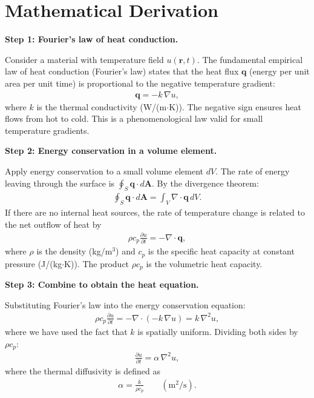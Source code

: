 \section*{Mathematical Derivation}

\textbf{Step 1: Fourier's law of heat conduction.}

Consider a material with temperature field $u(\mathbf{r}, t)$. The fundamental empirical law of heat conduction (Fourier's law) states that the heat flux $\mathbf{q}$ (energy per unit area per unit time) is proportional to the negative temperature gradient:
\begin{align}
\mathbf{q} = -k\,\nabla u,
\end{align}
where $k$ is the thermal conductivity (W/(m$\cdot$K)). The negative sign ensures heat flows from hot to cold. This is a phenomenological law valid for small temperature gradients.

\textbf{Step 2: Energy conservation in a volume element.}

Apply energy conservation to a small volume element $dV$. The rate of energy leaving through the surface is $\oint_S \mathbf{q}\cdot d\mathbf{A}$. By the divergence theorem:
\begin{align}
\oint_S \mathbf{q}\cdot d\mathbf{A} = \int_V \nabla\cdot\mathbf{q}\,dV.
\end{align}
If there are no internal heat sources, the rate of temperature change is related to the net outflow of heat by
\begin{align}
\rho c_p \frac{\partial u}{\partial t} = -\nabla\cdot\mathbf{q},
\end{align}
where $\rho$ is the density (kg/m$^3$) and $c_p$ is the specific heat capacity at constant pressure (J/(kg$\cdot$K)). The product $\rho c_p$ is the volumetric heat capacity.

\textbf{Step 3: Combine to obtain the heat equation.}

Substituting Fourier's law into the energy conservation equation:
\begin{align}
\rho c_p\frac{\partial u}{\partial t} = -\nabla\cdot(-k\,\nabla u) = k\,\nabla^2 u,
\end{align}
where we have used the fact that $k$ is spatially uniform. Dividing both sides by $\rho c_p$:
\begin{align}
\boxed{\frac{\partial u}{\partial t} = \alpha\,\nabla^2 u,}
\end{align}
where the thermal diffusivity is defined as
\begin{align}
\alpha = \frac{k}{\rho c_p} \qquad (\text{m}^2/\text{s}).
\end{align}

